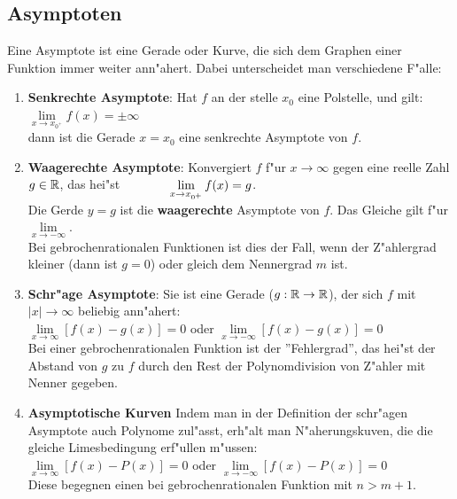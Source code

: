 \subsection{Asymptoten}

Eine Asymptote ist eine Gerade oder Kurve, die sich dem Graphen einer Funktion immer weiter ann"ahert. Dabei unterscheidet man verschiedene F"alle:\\
\begin{Definition}
\begin{enumerate}
\item \textbf{Senkrechte Asymptote}: Hat $f$ an der stelle $x_{0}$ eine Polstelle, und gilt:\\
\indent \qquad $\lim\limits_{x \rightarrow x_{0^{+}}} f(x) = \pm \infty$\\
dann ist die Gerade $x=x_{0}$ eine senkrechte Asymptote von $f$.\\
\item \textbf{Waagerechte Asymptote}: Konvergiert $f$ f"ur $x\rightarrow \infty$ gegen eine reelle Zahl $g\in \mathbb{R}$, das hei"st $\indent \qquad\lim\limits_{x \rightarrow x_{0^{+}}}{f(x)}=g$.\\
Die Gerde $y=g$ ist die \textbf{waagerechte} Asymptote von $f$. Das Gleiche gilt f"ur $\lim\limits_{x \rightarrow -\infty}$.\\
Bei gebrochenrationalen Funktionen ist dies der Fall, wenn der Z"ahlergrad kleiner (dann ist $g=0$) oder gleich dem Nennergrad $m$ ist.\\
\item \textbf{Schr"age Asymptote}: Sie ist eine Gerade ($g:\mathbb{R} \rightarrow \mathbb{R}$), der sich $f$ mit $|x|\rightarrow \infty$ beliebig ann"ahert:\\
\indent \qquad$\lim\limits_{x \rightarrow \infty}{[f(x)-g(x)]}=0$ oder $\lim\limits_{x \rightarrow -\infty}{[f(x)-g(x)]}=0$\\
Bei einer gebrochenrationalen Funktion ist der ''Fehlergrad'', das hei"st der Abstand von $g$ zu $f$ durch den Rest der Polynomdivision von Z"ahler mit Nenner gegeben.\\
\item \textbf{Asymptotische Kurven} Indem man in der Definition der schr"agen Asymptote auch Polynome zul"asst, erh"alt man N"aherungskuven, die die gleiche Limesbedingung erf"ullen m"ussen:\\
\indent \qquad$\lim\limits_{x \rightarrow \infty}{[f(x)-P(x)]}=0$ oder $\lim\limits_{x \rightarrow -\infty}{[f(x)-P(x)]}=0$\\
Diese begegnen einen bei gebrochenrationalen Funktion mit $n>m+1$.\\
\end{enumerate}
\end{Definition}

